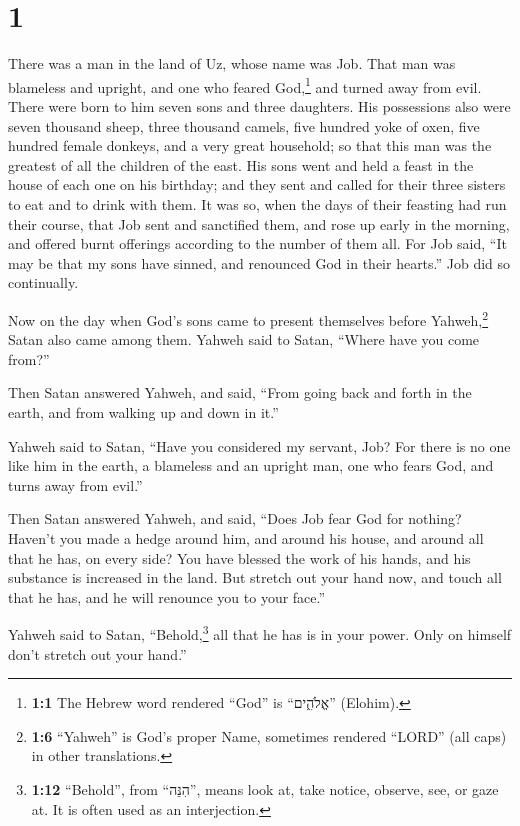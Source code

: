 \hypertarget{section}{%
\section{1}\label{section}}

 There was a man in the land of Uz, whose name was Job.
That man was blameless and upright, and one who feared God,\footnote{\textbf{1:1}
  The Hebrew word rendered ``God'' is ``אֱלֹהִ֑ים'' (Elohim).} and
turned away from evil.  There were born to him seven sons
and three daughters.  His possessions also were seven
thousand sheep, three thousand camels, five hundred yoke of oxen, five
hundred female donkeys, and a very great household; so that this man was
the greatest of all the children of the east.  His sons
went and held a feast in the house of each one on his birthday; and they
sent and called for their three sisters to eat and to drink with them.
 It was so, when the days of their feasting had run their
course, that Job sent and sanctified them, and rose up early in the
morning, and offered burnt offerings according to the number of them
all. For Job said, ``It may be that my sons have sinned, and renounced
God in their hearts.'' Job did so continually.

 Now on the day when God's sons came to present themselves
before Yahweh,\footnote{\textbf{1:6} ``Yahweh'' is God's proper Name,
  sometimes rendered ``LORD'' (all caps) in other translations.} Satan
also came among them.  Yahweh said to Satan, ``Where have
you come from?''

Then Satan answered Yahweh, and said, ``From going back and forth in the
earth, and from walking up and down in it.''

 Yahweh said to Satan, ``Have you considered my servant,
Job? For there is no one like him in the earth, a blameless and an
upright man, one who fears God, and turns away from evil.''

 Then Satan answered Yahweh, and said, ``Does Job fear God
for nothing?  Haven't you made a hedge around him, and
around his house, and around all that he has, on every side? You have
blessed the work of his hands, and his substance is increased in the
land.  But stretch out your hand now, and touch all that
he has, and he will renounce you to your face.''

 Yahweh said to Satan, ``Behold,\footnote{\textbf{1:12}
  ``Behold'', from ``הִנֵּה'', means look at, take notice, observe, see,
  or gaze at. It is often used as an interjection.} all that he has is
in your power. Only on himself don't stretch out your hand.''

